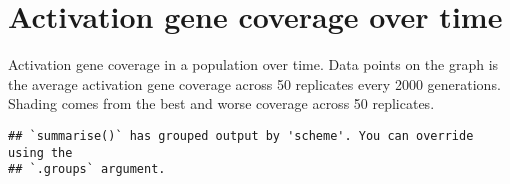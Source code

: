 \documentclass[]{book}
\newenvironment{Shaded}{\begin{snugshade}}{\end{snugshade}}
\newcommand{\DataTypeTok}[1]{\textcolor[rgb]{0.13,0.29,0.53}{#1}}
\newcommand{\KeywordTok}[1]{\textcolor[rgb]{0.13,0.29,0.53}{\textbf{#1}}}
\newcommand{\NormalTok}[1]{#1}
\newcommand{\OperatorTok}[1]{\textcolor[rgb]{0.81,0.36,0.00}{\textbf{#1}}}
\newcommand{\StringTok}[1]{\textcolor[rgb]{0.31,0.60,0.02}{#1}}
\begin{document}
\hypertarget{activation-gene-coverage-over-time}{%
\section{Activation gene coverage over time}\label{activation-gene-coverage-over-time}}

Activation gene coverage in a population over time.
Data points on the graph is the average activation gene coverage across 50 replicates every 2000 generations.
Shading comes from the best and worse coverage across 50 replicates.

\begin{Shaded}
\end{Shaded}

\begin{verbatim}
## `summarise()` has grouped output by 'scheme'. You can override using the
## `.groups` argument.
\end{verbatim}
\end{document}
